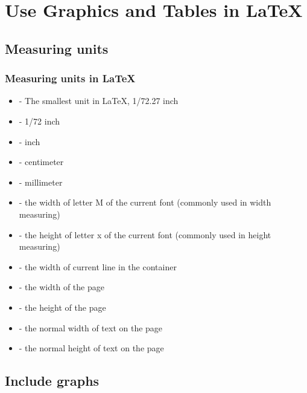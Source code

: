 \section{Use Graphics and Tables in \LaTeX}
\begin{frame}
\end{frame}

\subsection{Measuring units}

\begin{frame}
	\frametitle{Measuring units in \LaTeX}
	\begin{itemize}
		\item {} - The smallest unit in \LaTeX, 1/72.27 inch
		\item {} - 1/72 inch
		\item {} - inch
		\item {} - centimeter
		\item {} - millimeter
		\item {} - the width of letter M of the current font (commonly used in width measuring)
		\item {} - the height of letter x of the current font (commonly used in height measuring)
		\item {} - the width of current line in the container
		\item {} - the width of the page
		\item {} - the height of the page
		\item {} - the normal width of text on the page
		\item {} - the normal height of text on the page
	\end{itemize}
\end{frame}

\subsection{Include graphs}

